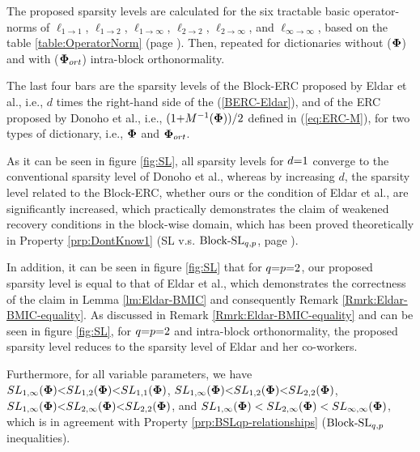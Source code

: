 The proposed sparsity levels are calculated for the six tractable basic operator-norms of $\ell_{1 {\to} 1}$, $\ell_{1 {\to} 2}$, $\ell_{1 {\to} \infty}$, $\ell_{2 {\to} 2}$, $\ell_{2 {\to} \infty}$, and $\ell_{\infty {\to} \infty}$, based on the table \ref{table:OperatorNorm} (page \pageref{table:OperatorNorm}).
Then, repeated for dictionaries without ($\boldsymbol{\Phi}$) and with ($\boldsymbol{\Phi}_{ort}$) intra-block orthonormality.

The last four bars are the sparsity levels of the Block-ERC proposed by Eldar et al., i.e., $d$ times the right-hand side of the (\ref{BERC-Eldar}), and of the ERC proposed by Donoho et al., i.e., $(1 {+} M^{-1}(\boldsymbol{\Phi})) / 2$ defined in (\ref{eq:ERC-M}), for two types of dictionary, i.e., $\boldsymbol{\Phi}$ and $\boldsymbol{\Phi}_{ort}$.

As it can be seen in figure \ref{fig:SL}, all sparsity levels for $d {=} 1$ converge to the conventional sparsity level of Donoho et al., whereas by increasing $d$, the sparsity level related to the Block-ERC, whether ours or the condition of Eldar et al., are significantly increased, which practically demonstrates the claim of weakened recovery conditions in the block-wise domain, which has been proved theoretically in Property \ref{prp:DontKnow1} (SL v.s. $\mathrm{Block\text{{-}}SL}_{q,p}$, page \pageref{prp:DontKnow1}).
\iffalse
In Lemma \ref{lm:Eldar-BMIC}, it is theoretically proved that for $q \sgeq p$, if $M^{Eldar}_{Intra}(\myPhi)$ is sufficiently small, then the proposed Block-ERC outperforms the condition of Eldar and her co-workers. 
However, it can be seen in figure \ref{fig:SL} that in practice even for $q \sleq p$ the sparsity level corresponding to the proposed Block-MCC$_{q,p}$ is higher than the sparsity level of Eldar and her co-workers.
\fi

In addition, it can be seen in figure \ref{fig:SL} that 
for $q {=} p {=} 2$, our proposed sparsity level is equal to that of Eldar et al., which demonstrates the correctness of the claim in Lemma \ref{lm:Eldar-BMIC} and consequently Remark \ref{Rmrk:Eldar-BMIC-equality}.
As discussed in Remark \ref{Rmrk:Eldar-BMIC-equality} and can be seen in figure \ref{fig:SL}, for $q {=} p {=} 2$ and intra-block orthonormality, the proposed sparsity level reduces to the sparsity level of Eldar and her co-workers.

Furthermore, for all variable parameters, we have $SL_{1,\infty}(\boldsymbol{\Phi}) {<} SL_{1,2}(\boldsymbol{\Phi}) {<} SL_{1,1}(\boldsymbol{\Phi})$, $SL_{1,\infty}(\boldsymbol{\Phi}) {<} SL_{1,2}(\boldsymbol{\Phi}) {<} SL_{2,2}(\boldsymbol{\Phi})$, $SL_{1,\infty}(\boldsymbol{\Phi}) {<} SL_{2,\infty}(\boldsymbol{\Phi}) {<} SL_{2,2}(\boldsymbol{\Phi})$, and $SL_{1,\infty}(\boldsymbol{\Phi}) < SL_{2,\infty}(\boldsymbol{\Phi}) < SL_{\infty,\infty}(\boldsymbol{\Phi})$, which is in agreement with Property \ref{prp:BSLqp-relationships} ($\mathrm{Block\text{{-}}SL}_{q,p}$ inequalities).

